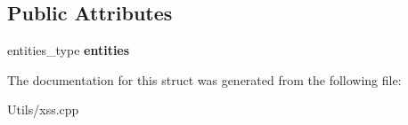\subsection*{Public Attributes}
\begin{DoxyCompactItemize}
\item 
\hypertarget{structcppcms_1_1xss_1_1basic__rules__holder_ac8d5cf386648c0cb87035eaff0c2e05d}{entities\-\_\-type {\bfseries entities}}\label{structcppcms_1_1xss_1_1basic__rules__holder_ac8d5cf386648c0cb87035eaff0c2e05d}

\end{DoxyCompactItemize}


The documentation for this struct was generated from the following file\-:\begin{DoxyCompactItemize}
\item 
Utils/xss.\-cpp\end{DoxyCompactItemize}
